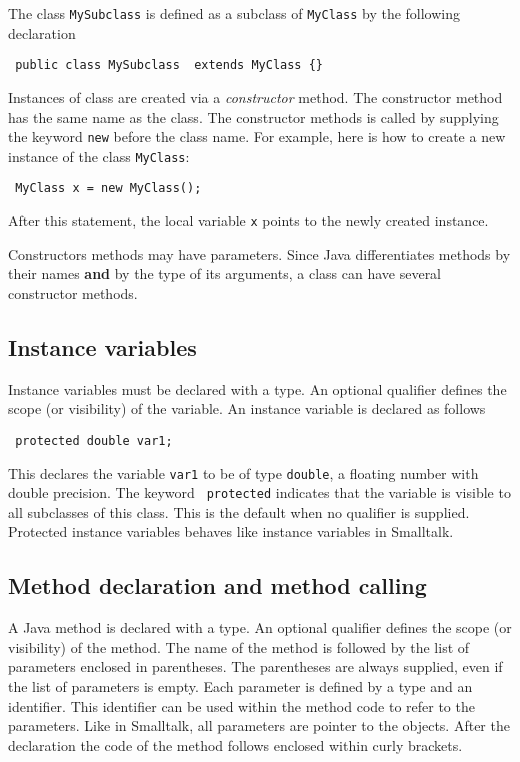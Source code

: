 \documentclass[twoside]{book}
\begin{document}
\noindent The class {\tt MySubclass} is defined as a subclass of
{\tt MyClass} by the following declaration
\begin{verbatim}
 public class MySubclass  extends MyClass {}
\end{verbatim}

Instances of class are created via a {\sl constructor} method. The
constructor method has the same name as the class. The constructor
methods is called by supplying the keyword {\tt new} before the
class name. For example, here is how to create a new instance of
the class {\tt MyClass}:
\begin{verbatim}
 MyClass x = new MyClass();
\end{verbatim}
After this statement, the local variable {\tt x} points to the
newly created instance.

Constructors methods may have parameters. Since Java
differentiates methods by their names {\bf and} by the type of its
arguments, a class can have several constructor methods.

\subsection{Instance variables}
Instance variables must be declared with a type. An optional
qualifier defines the scope (or visibility) of the variable. An
instance variable is declared as follows
\begin{verbatim}
 protected double var1;
\end{verbatim}
This declares the variable {\tt var1} to be of type {\tt double},
a floating number with double precision. The keyword {\tt
protected} indicates that the variable is visible to all
subclasses of this class. This is the default when no qualifier is
supplied. Protected instance variables behaves like instance
variables in Smalltalk.

\subsection{Method declaration and method calling}
A Java method is declared with a type. An optional qualifier
defines the scope (or visibility) of the method. The name of the
method is followed by the list of parameters enclosed in
parentheses. The parentheses are always supplied, even if the list
of parameters is empty. Each parameter is defined by a type and an
identifier. This identifier can be used within the method code to
refer to the parameters. Like in Smalltalk, all parameters are
pointer to the objects. After the declaration the code of the
method follows enclosed within curly brackets.
\end{document}
